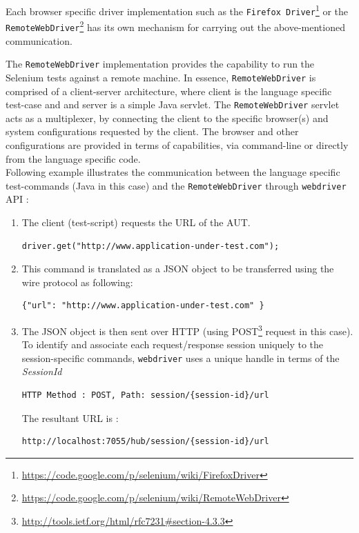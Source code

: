 Each browser specific driver implementation such as the \texttt{Firefox Driver}\footnote{\url{https://code.google.com/p/selenium/wiki/FirefoxDriver}} or the \texttt{RemoteWebDriver}\footnote{\url{https://code.google.com/p/selenium/wiki/RemoteWebDriver}} has its own mechanism for carrying out the above-mentioned communication. 

The \texttt{RemoteWebDriver} implementation provides the capability to run the Selenium tests against a remote machine. In essence, \texttt{RemoteWebDriver} is comprised of a client-server architecture, where client is the language specific test-case and and server is a simple Java servlet. The \texttt{RemoteWebDriver} servlet acts as a multiplexer, by connecting the client to the specific browser(s) and system configurations requested by the client. The browser and other configurations are provided in terms of capabilities, via command-line or directly from the language specific code. \\

\noindent 
Following example illustrates the communication between the language specific test-commands (Java in this case) and the \texttt{RemoteWebDriver} through \texttt{webdriver} API :
\begin{enumerate}
\item The client (test-script) requests the URL of the AUT. 
\begin{verbatim}
driver.get("http://www.application-under-test.com");
\end{verbatim}
\item This command is translated as a JSON object to be transferred using the wire protocol as following: 
\begin{verbatim}
{"url": "http://www.application-under-test.com" }
\end{verbatim}
\item The JSON object is then sent over HTTP (using POST\footnote{\url{http://tools.ietf.org/html/rfc7231\#section-4.3.3}} request in this case). To identify and associate each request/response session uniquely to the session-specific commands, \texttt{webdriver} uses a unique handle in terms of the \textit{SessionId}
\begin{verbatim}
HTTP Method : POST, Path: session/{session-id}/url
\end{verbatim}
The resultant URL is :
\begin{verbatim}
http://localhost:7055/hub/session/{session-id}/url
\end{verbatim}
\end{enumerate}

